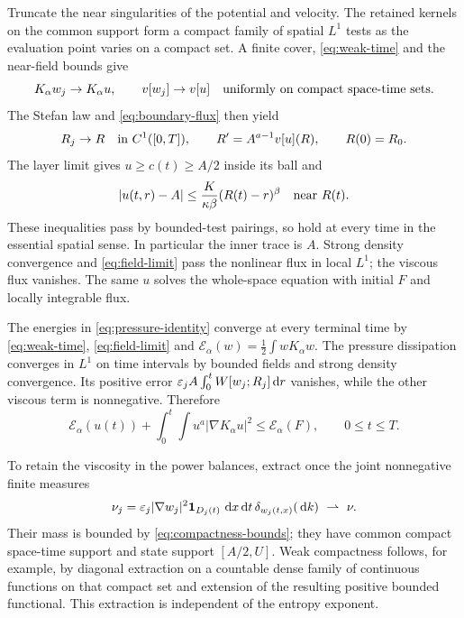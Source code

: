 Truncate the near singularities of the potential and velocity. The retained
kernels on the common support form a compact family of spatial $L^1$
tests as the evaluation point varies on a compact set. A finite cover,
\eqref{eq:weak-time} and the near-field bounds give
\begin{equation}\label{eq:field-limit}
 K_\alpha w_j\to K_\alpha u,\qquad v[w_j]\to v[u]
 \quad\hbox{uniformly on compact space-time sets}.
\end{equation}
The Stefan law and \eqref{eq:boundary-flux} then yield
\begin{equation}\label{eq:radius-limit}
 R_j\to R\quad\hbox{in }C^1([0,T]),\qquad
 R'=A^{a-1}v[u](R),\qquad R(0)=R_0.
\end{equation}
The layer limit gives $u\geq c(t)\geq A/2$ inside its ball and
\begin{equation}\label{eq:trace-modulus}
 |u(t,r)-A|\leq\frac{K}{\kappa\beta}(R(t)-r)^\beta
 \quad\hbox{near }R(t).
\end{equation}
These inequalities pass by bounded-test pairings, so hold at every time
in the essential spatial sense. In particular the inner trace is $A$.
Strong density convergence and \eqref{eq:field-limit} pass the nonlinear
flux in local $L^1$; the viscous flux vanishes. The same $u$ solves the
whole-space equation with initial $F$ and locally integrable flux.

The energies in \eqref{eq:pressure-identity} converge at every terminal
time by \eqref{eq:weak-time}, \eqref{eq:field-limit} and
$\mathcal E_\alpha(w)=\tfrac12\int wK_\alpha w$.
The pressure dissipation converges in $L^1$ on time intervals by bounded
fields and strong density convergence. Its positive error
$\varepsilon_j A\int_0^tW[w_j;R_j]\,\mathrm d r$ vanishes, while the other viscous term
is nonnegative. Therefore
\begin{equation}\label{eq:limit-pressure}
 \mathcal E_\alpha(u(t))+
 \int_0^t\int u^a|\nabla K_\alpha u|^2
 \leq\mathcal E_\alpha(F),\qquad 0\leq t\leq T.
\end{equation}

To retain the viscosity in the power balances, extract once the joint
nonnegative finite measures
\begin{equation}\label{eq:nu}
 \nu_j=\varepsilon_j|\nabla w_j|^2\mathbf1_{D_j(t)}\,\,\mathrm d x\,\mathrm d t\,
             \delta_{w_j(t,x)}(\,\mathrm d k)\ \rightharpoonup\ \nu.
\end{equation}
Their mass is bounded by \eqref{eq:compactness-bounds}; they have common
compact space-time support and state support $[A/2,U]$.
Weak compactness follows, for example, by diagonal extraction on a
countable dense family of continuous functions on that compact set and
extension of the resulting positive bounded functional. This extraction
is independent of the entropy exponent.

